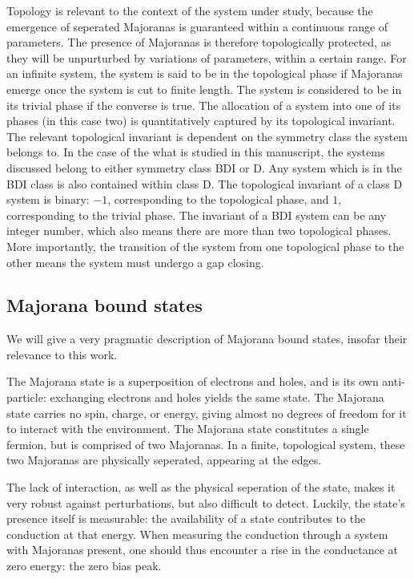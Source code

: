 	Topology is relevant to the context of the system under study, because the emergence of seperated Majoranas is guaranteed within a continuous range of parameters.
	The presence of Majoranas is therefore topologically protected, as they will be unpurturbed by variations of parameters, within a certain range.
	For an infinite system, the system is said to be in the topological phase if Majoranas emerge once the system is cut to finite length.
	The system is considered to be in its trivial phase if the converse is true.
	The allocation of a system into one of its phases (in this case two) is quantitatively captured by its topological invariant.
	The relevant topological invariant is dependent on the symmetry class the system belongs to.
	In the case of the what is studied in this manuscript, the systems discussed belong to either symmetry class BDI or D.
	Any system which is in the BDI class is also contained within class D.
	The topological invariant of a class D system is binary: $-1$, corresponding to the topological phase, and $1$, corresponding to the trivial phase.
	The invariant of a BDI system can be any integer number, which also means there are more than two topological phases.
	More importantly, the transition of the system from one topological phase to the other means the system must undergo a gap closing.


	\subsection{Majorana bound states}
		We will give a very pragmatic description of Majorana bound states, insofar their relevance to this work.

		The Majorana state is a superposition of electrons and holes, and is its own anti-particle: exchanging electrons and holes yields the same state.
		The Majorana state carries no spin, charge, or energy, giving almost no degrees of freedom for it to interact with the environment.
		The Majorana state constitutes a single fermion, but is comprised of two Majoranas.
		In a finite, topological system, these two Majoranas are physically seperated, appearing at the edges.

		The lack of interaction, as well as the physical seperation of the state, makes it very robust against perturbations, but also difficult to detect.
		Luckily, the state's presence itself is measurable: the availability of a state contributes to the conduction at that energy.
		When measuring the conduction through a system with Majoranas present, one should thus encounter a rise in the conductance at zero energy: the zero bias peak.

